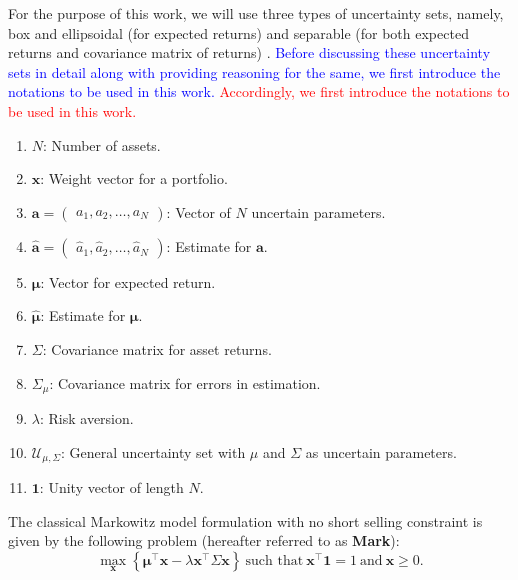 \documentclass[12pt]{article}
\numberwithin{equation}{section}
\begin{document}
For the purpose of this work, we will use three types of uncertainty sets, namely, box and ellipsoidal (for expected returns) \cite{Fabozzi07,Kim14} and separable (for both expected returns and covariance matrix of returns) \cite{Lu06}. \textcolor{blue}{Before discussing these uncertainty sets in detail along with providing reasoning for the same, we first introduce the notations to be used in this work.} \textcolor{red}{Accordingly, we first introduce the notations to be used in this work.}
\begin{enumerate}
\item $N$: Number of assets.
\item $\displaystyle{\mathbf{x}}$: Weight vector for a portfolio.
\item $\displaystyle{\mathbf{a}=\begin{pmatrix} a_{1}, a_{2}, \dots , a_{N} \end{pmatrix}}$: Vector of $N$ uncertain parameters.
\item $\displaystyle{\mathbf{\hat{a}}=\begin{pmatrix}\hat{a}_{1}, \hat{a}_{2}, \dots, \hat{a}_{N} \end{pmatrix}}$: Estimate for $\displaystyle{\mathbf{a}}$.
\item $\displaystyle{\boldsymbol{\mu}}$: Vector for expected return.
\item $\displaystyle{\boldsymbol{{\hat{\mu}}}}$: Estimate for $\displaystyle{\boldsymbol{\mu}}$.
\item $\displaystyle{\Sigma}$: Covariance matrix for asset returns.
\item $\displaystyle{\Sigma_{\mu}}$: Covariance matrix for errors in estimation.
\item $\lambda$: Risk aversion.
\item $\displaystyle{\mathcal{U}_{\mu,\Sigma}}$: General uncertainty set with $\mu$ and $\Sigma$ as uncertain parameters.
\item $\displaystyle{\mathbf{1}}$: Unity vector of length $N$.
\end{enumerate}

The classical Markowitz model formulation with no short selling constraint is given by the following problem (hereafter referred to as \textbf{Mark}):
\begin{equation}
\label{eq:classical_markowitz}
\max\limits_{\mathbf{x}}\left\{\boldsymbol{\mu}^{\top}\mathbf{x}-\lambda\mathbf{x^{\top}}\Sigma\mathbf{x}\right\}~\text{such that}~
\mathbf{x^{\top}}\mathbf{1}=1~\text{and}~\mathbf{x}\geq 0.
\end{equation}
\end{document}
